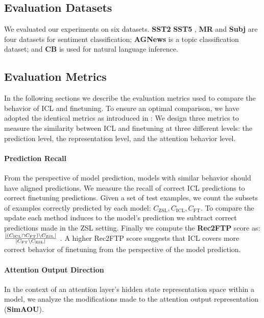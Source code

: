 \subsection{Evaluation Datasets}

We evaluated our experiments on six datasets. \textbf{SST2} \cite{socher-etal-2013-recursive} \textbf{SST5} \cite{socher-etal-2013-recursive}, \textbf{MR} \cite{10.3115/1219840.1219855} and \textbf{Subj} \cite{10.3115/1218955.1218990} are four datasets for sentiment classification; \textbf{AGNews} \cite{NIPS2015_250cf8b5} is a topic classification dataset; and \textbf{CB} \cite{Marneffe2019TheCI} is used
for natural language inference.

\subsection{Evaluation Metrics}

In the following sections we describe the evaluation metrics used to compare the behavior of ICL and finetuning.
To ensure an optimal comparison, we have adopted the identical metrics as introduced in \cite{dai2023gpt}:
We design three metrics to measure the similarity between ICL and finetuning at three different levels: the prediction level, the representation level, and the attention behavior level. 

\paragraph{Prediction Recall}

From the perspective of model prediction, models with similar behavior should have aligned predictions.
We measure the recall of correct ICL predictions to correct finetuning predictions.
Given a set of test examples, we count the subsets of examples correctly predicted by each model: $C_{\text{ZSL}}, C_{\text{ICL}}, C_{\text{FT}}$.
To compare the update each method induces to the model's prediction we subtract correct predictions made in the ZSL setting.
Finally we compute the \textbf{Rec2FTP} score as: $\frac{ \left| \left( C_{\text{ICL}} \cap C_{\text{FT}} \right) \setminus C_{\text{ZSL}} \right| }{ \left| C_{\text{FT}} \setminus C_{\text{ZSL}} \right| }$ .
A higher Rec2FTP score suggests that ICL covers more correct behavior of finetuning from the perspective of the model prediction.


\paragraph{Attention Output Direction}
In the context of an attention layer's hidden state representation space within a model, we analyze the modifications made to the attention output representation (\textbf{SimAOU}).

